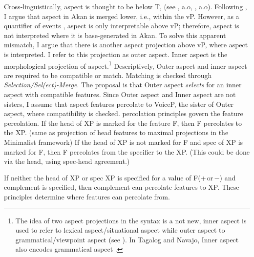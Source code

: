 \documentclass[output=paper,colorlinks,citecolor=brown]{langscibook}
\begin{document}
Cross-linguistically, aspect is thought to be below T, (see \citet{Rizzi2004} \citet{Rizzi2013Notes}, a.o, \citet{Cinque2002, Cinque2006}, \citet{RizziCinque2016} \citet{CinqueRizzi2010} a.o). Following \citet{Kandybowicz2010, Kandybowicz2015}, I argue that aspect in Akan is merged lower, i.e., within the vP.  However, as a quantifier of events \citep{Hacquard2006}, aspect is only interpretable above vP; therefore, aspect is not interpreted where it is base-generated in Akan. To solve this apparent mismatch, I argue that there is another aspect projection above vP, where aspect is interpreted. I refer to this projection as outer aspect. Inner aspect is the morphological projection of aspect.\footnote{The idea of two aspect projections in the syntax is a not new, inner aspect is used to refer to lexical aspect/situational aspect while outer aspect to grammatical/viewpoint aspect (see \citealt{Travis2010, Travis1991, Smith1991, MacDonald2006}). In Tagalog and Navajo, Inner aspect also encodes grammatical aspect \citep{Travis2010}.} Descriptively, Outer aspect and inner aspect are required to be compatible or match. Matching is checked through \textit{Selection/Sel(ect)-Merge}. The proposal is that Outer aspect \textit{selects} for an inner aspect with compatible features. Since Outer aspect and Inner aspect are not sisters, 
I assume that aspect features percolate to VoiceP, the sister of Outer aspect, where compatibility is checked.  percolation principles govern the feature percolation. \nocite{Webelhuth1992}
\eanoraggedright \label{ex16}
\ea If the head of XP is marked for the feature F, then F percolates to the XP. (same as projection of head features to maximal projections in the Minimalist framework)
\ex If the head of XP is not marked for F and spec of XP is marked for F, then F percolates from the specifier to the XP. (This could be done via the head, using spec-head agreement.)

\ex If neither the head of XP or spec XP is specified for a value of F(+\,or\,−) and complement is specified, then complement can percolate features to XP. 
\z
\z
These principles determine where features can percolate from.
 
\end{document}
